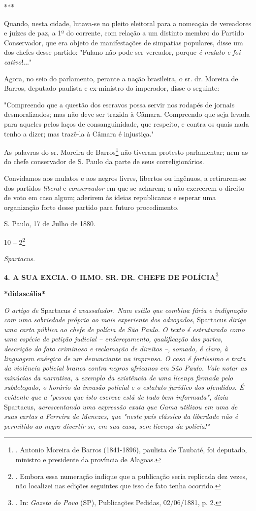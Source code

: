 ***

Quando, nesta cidade, lutava-se no pleito eleitoral para a nomeação de
vereadores e juízes de paz, a 1º do corrente, com relação a um distinto
membro do Partido Conservador, que era objeto de manifestações de
simpatias populares, disse um dos chefes desse partido: "Fulano não pode
ser vereador, porque \emph{é} \emph{mulato e foi cativo}!..."

Agora, no seio do parlamento, perante a nação brasileira, o sr. dr.
Moreira de Barros, deputado paulista e ex-ministro do imperador, disse o
seguinte:

"Compreendo que a questão dos escravos possa servir nos rodapés de
jornais desmoralizados; mas não deve ser trazida à Câmara. Compreendo
que seja levada para aqueles pelos laços de consanguinidade, que
respeito, e contra os quais nada tenho a dizer; mas trazê-la à Câmara é
injustiça."

As palavras do sr. Moreira de Barros\footnote{. Antonio Moreira de
  Barros (1841-1896), paulista de Taubaté, foi deputado, ministro e
  presidente da província de Alagoas.} não tiveram protesto parlamentar;
nem as do chefe conservador de S. Paulo da parte de seus
correligionários.

Convidamos aos mulatos e aos negros livres, libertos ou ingênuos, a
retirarem-se dos partidos \emph{liberal} e \emph{conservador} em que se
acharem; a não exercerem o direito de voto em caso algum; aderirem às
ideias republicanas e esperar uma organização forte desse partido para
futuro procedimento.

S. Paulo, 17 de Julho de 1880.

10 -- 2\footnote{. Embora essa numeração indique que a publicação seria
  replicada dez vezes, não localizei nas edições seguintes que isso de
  fato tenha ocorrido.}

\emph{Spartacus.}

\textbf{4. A SUA EXCIA. O ILMO. SR. DR. CHEFE DE POLÍCIA}\footnote{. In:
  \emph{Gazeta do Povo} (SP), Publicações Pedidas, 02/06/1881, p. 2.}

\textbf{*didascália*}

\emph{O artigo de} Spartacus \emph{é avassalador. Num estilo que combina
fúria e indignação com uma sobriedade própria ao mais experiente dos
advogados,} Spartacus \emph{dirige uma carta pública ao chefe de polícia
de São Paulo. O texto é estruturado como uma espécie de petição judicial
-- endereçamento, qualificação das partes, descrição do fato criminoso e
reclamação de direitos --, somado, é claro, à linguagem enérgica de um
denunciante na imprensa. O caso é fortíssimo e trata da violência
policial branca contra negros africanos em São Paulo. Vale notar as
minúcias da narrativa, a exemplo da existência de uma licença firmada
pelo subdelegado, o horário da invasão policial e o estatuto jurídico
dos ofendidos. É evidente que a "pessoa que isto escreve está de tudo
bem informada", dizia} Spartacus\emph{, acrescentando uma expressão
exata que Gama utilizou em uma de suas cartas a Ferreira de Menezes, que
"neste país clássico da liberdade não é permitido ao negro divertir-se,
em sua casa, sem licença da polícia!" }

